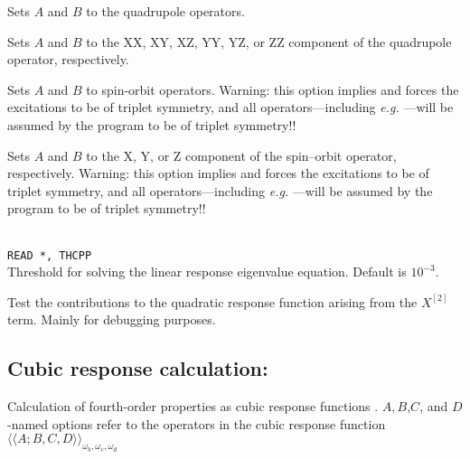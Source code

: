 \begin{description}
\item{}
Sets $A$ and $B$ to the quadrupole operators.

\item{}
Sets $A$ and $B$ to the XX, XY, XZ, YY, YZ, or ZZ component of the
quadrupole operator, respectively.


\item{}
Sets $A$ and $B$ to spin-orbit operators.
Warning: this option implies  and
forces the excitations to be of triplet symmetry,
and all operators---including
{\it e.g.\/} ---will be assumed by the program to be of triplet symmetry!!

\item{}
Sets $A$ and $B$ to the X, Y, or Z component of the spin--orbit
operator, respectively.
Warning: this option implies  and
forces the excitations to be of triplet symmetry,
and all operators---including
{\it e.g.\/} ---will be assumed by the program to be of triplet symmetry!!

\item{}\\
\verb|READ *, THCPP|\\
Threshold for solving the linear response
eigenvalue equation. Default is $10^{-3}$.

\item{}
Test the contributions to the quadratic response function arising from
the $X^{\left[2\right]}$ term. Mainly for debugging purposes.
\end{description}


\subsection{Cubic response calculation: }
Calculation of fourth-order properties as cubic response functions
\cite{pndjovhacpl242,djpnhajcp105,pndjhapdkrthhkcpl253}.
$A,B$,$C$, and $D$-named options refer to the operators in the cubic
response function 
$\langle\!\langle A;B,C,D \rangle\!\rangle_{\omega_b,\omega_c,\omega_d}$

